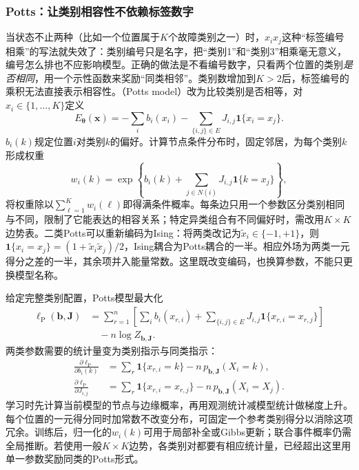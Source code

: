 \subsubsection{Potts：让类别相容性不依赖标签数字}
\label{sec:pgm-energy-models-potts}

当状态不止两种（比如一个位置属于$K$个故障类别之一）时，$x_ix_j$这种“标签编号相乘”的写法就失效了：类别编号只是名字，把“类别1”和“类别3”相乘毫无意义，编号怎么排也不应影响模型。正确的做法是不看编号数字，只看两个位置的类别\emph{是否相同}，用一个示性函数来奖励“同类相邻”。类别数增加到$K>2$后，标签编号的乘积无法直接表示相容性。（Potts model）改为比较类别是否相等，对$x_i\in\{1,\ldots,K\}$定义
\begin{equation}
  E_{\bm{\theta}}(\bm{x})
   =-\sum_i b_i(x_i)
    -\sum_{\{i,j\}\in E}J_{i,j}\mathbf{1}\{x_i=x_j\}.
  \label{eq:pgm-energy-models-potts}
\end{equation}
$b_i(k)$规定位置$i$对类别$k$的偏好。计算节点条件分布时，固定邻居，为每个类别$k$形成权重
\[
  w_i(k)=\exp\left\{
    b_i(k)+\sum_{j\in N(i)}J_{i,j}\mathbf{1}\{k=x_j\}
  \right\},
\]
将权重除以$\sum_{\ell=1}^K w_i(\ell)$即得满条件概率。每条边只用一个参数区分类别相同与不同，限制了它能表达的相容关系；特定异类组合有不同偏好时，需改用$K\times K$边势表。二类Potts可以重新编码为Ising：将两类改记为$\widetilde{x}_i\in\{-1,+1\}$，则$\mathbf{1}\{x_i=x_j\}=(1+\widetilde{x}_i\widetilde{x}_j)/2$，Ising耦合为Potts耦合的一半。相应外场为两类一元得分之差的一半，其余项并入能量常数。这里既改变编码，也换算参数，不能只更换模型名称。

给定完整类别配置，Potts模型最大化
\begin{equation}
  \begin{aligned}
  \ell_{\mathrm{P}}(\bm{b},\bm{J})
   &=\sum_{r=1}^n\left[
       \sum_i b_i(x_{r,i})+
       \sum_{\{i,j\}\in E}J_{i,j}
               \mathbf{1}\{x_{r,i}=x_{r,j}\}\right]\\
   &\quad-n\log Z_{\bm{b},\bm{J}}.
  \end{aligned}
  \label{eq:pgm-energy-models-potts-likelihood}
\end{equation}
两类参数需要的统计量变为类别指示与同类指示：
\[
  \begin{aligned}
    \frac{\partial\ell_{\mathrm{P}}}{\partial b_i(k)}
      &=\sum_r\mathbf{1}\{x_{r,i}=k\}
          -n\,p_{\bm{b},\bm{J}}(X_i=k),\\
    \frac{\partial\ell_{\mathrm{P}}}{\partial J_{i,j}}
      &=\sum_r\mathbf{1}\{x_{r,i}=x_{r,j}\}
          -n\,p_{\bm{b},\bm{J}}(X_i=X_j).
  \end{aligned}
\]
学习时先计算当前模型的节点与边缘概率，再用观测统计减模型统计做梯度上升。每个位置的一元得分同时加常数不改变分布，可固定一个参考类别得分以消除这项冗余。训练后，归一化的$w_i(k)$可用于局部补全或Gibbs更新；联合事件概率仍需全局推断。若使用一般$K\times K$边势，各类别对都要有相应统计量，已经超出这里用单一参数奖励同类的Potts形式。

